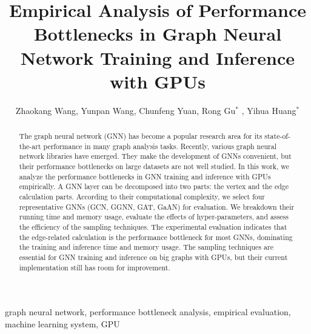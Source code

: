\documentclass{elsarticle}
\begin{document}
\begin{frontmatter}

	\title{Empirical Analysis of Performance Bottlenecks in Graph Neural Network Training and Inference with GPUs}
    \author{Zhaokang Wang, Yunpan Wang, Chunfeng Yuan, Rong Gu$^*$ , Yihua Huang$^*$ }
	\address{State Key Laboratory for Novel Software Technology, \\Department of Computer Science and Technology, Nanjing University, \\Nanjing 210023, China}

	\begin{abstract}
		The graph neural network (GNN) has become a popular research area for its state-of-the-art performance in many graph analysis tasks.
		Recently, various graph neural network libraries have emerged.
        They make the development of GNNs convenient, but their performance bottlenecks on large datasets are not well studied.
		In this work, we analyze the performance bottlenecks in GNN training and inference with GPUs empirically.
		A GNN layer can be decomposed into two parts: the vertex and the edge calculation parts.
		According to their computational complexity, we select four representative GNNs (GCN, GGNN, GAT, GaAN) for evaluation.
		We breakdown their running time and memory usage, evaluate the effects of hyper-parameters, and assess the efficiency of the sampling techniques.
		The experimental evaluation indicates that the edge-related calculation is the performance bottleneck for most GNNs, dominating the training and inference time and memory usage.
        The sampling techniques are essential for GNN training and inference on big graphs with GPUs, but their current implementation still has room for improvement.
	\end{abstract}

	\begin{keyword}
		graph neural network, performance bottleneck analysis, empirical evaluation, machine learning system, GPU
	\end{keyword}

\end{frontmatter}

\linenumbers










\end{document}
